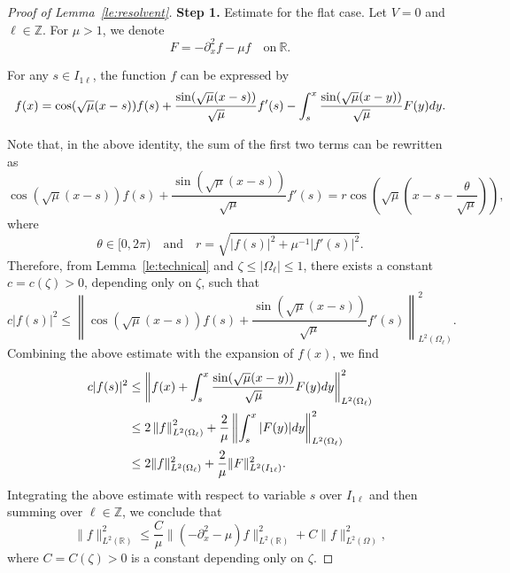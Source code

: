 \documentclass[a4paper,reqno]{amsart}
\theoremstyle{definition}
\numberwithin{equation}{section}
\newcommand{\R}{\mathbb{R}}
\def \R {{\mathbb{R} }}
\def \d {{\rm{d}}}
\begin{document}
\begin{proof}[Proof of Lemma~\ref{le:resolvent}]

\textbf{Step 1.} Estimate for the flat case. Let $V=0$ and $\ell\in \mathbb{Z}$. For $\mu>1$, we denote
\begin{equation*}
    F=-\partial_{x}^{2}f-\mu f\quad \mbox{on}\ \R.
\end{equation*}

For any $s\in I_{1\ell}$, the function $f$ can be expressed by 
\begin{equation*}
    f(x)=\cos (\sqrt{\mu}(x-s))f(s)+\frac{\sin  (\sqrt{\mu}(x-s))}{\sqrt{\mu}}f'(s)-\int_{s}^{x}\frac{\sin  (\sqrt{\mu}(x-y))}{\sqrt{\mu}}F(y)\d y.
    \end{equation*}

Note that, in the above identity, the sum of the first two terms can be rewritten as
\begin{equation*}
    \cos (\sqrt{\mu}(x-s))f(s)+\frac{\sin  (\sqrt{\mu}(x-s))}{\sqrt{\mu}}f'(s)=r\cos \left(\sqrt{\mu}\left(x-s-\frac{\theta}{\sqrt{\mu}}\right)\right),
    \end{equation*}
    where
    \begin{equation*} 
        \theta\in [0,2\pi)\quad \mbox{and}\quad 
           r=\sqrt{|f(s)|^{2}+\mu^{-1}|f'(s)|^{2}}.
\end{equation*}
Therefore, from Lemma~\ref{le:technical} and $\zeta\le |\Omega_{\ell}|\le 1$, there exists a constant $c=c(\zeta)>0$, depending only on $\zeta$, such that
    \begin{equation*}
        c|f(s)|^{2}\le \left\| \cos (\sqrt{\mu}(x-s))f(s)+\frac{\sin  (\sqrt{\mu}(x-s))}{\sqrt{\mu}}f'(s)\right\|_{L^{2}(\Omega_{\ell})}^{2}.
        \end{equation*}
Combining the above estimate with the expansion of $f(x)$, we find
\begin{equation*}
\begin{aligned}
    c|f(s)|^{2}&\le \left\|f(x)+\int_{s}^{x}\frac{\sin  (\sqrt{\mu}(x-y))}{\sqrt{\mu}}F(y)\d y\right\|^{2}_{L^{2}(\Omega_{\ell})}\\
    &\le 2\left\|f\right\|_{L^{2}(\Omega_{\ell})}^{2}+\frac{2}{\mu}\left\|\int_{s}^{x}|F(y)|\d y\right\|^{2}_{L^{2}(\Omega_{\ell})}\\
    &\le 2\|f\|_{L^{2}(\Omega_{\ell})}^{2}+\frac{2}{\mu}\|F\|^{2}_{L^{2}(I_{1\ell})}.
   \end{aligned}
\end{equation*}
Integrating the above estimate with respect to variable $s$ over $I_{1\ell}$ and then summing over $\ell\in \mathbb{Z}$, we conclude that 
\begin{equation}\label{est:V=0}
    \|f\|_{L^{2}(\R)}^{2}\le \frac{C}{\mu}\|(-\partial_{x}^{2}-\mu)f\|_{L^{2}(\R)}^{2}+C\|f\|_{L^{2}(\Omega)}^{2},
    \end{equation}
    where $C=C(\zeta)>0$ is a constant depending only on $\zeta$.


\end{proof}
\end{document}
